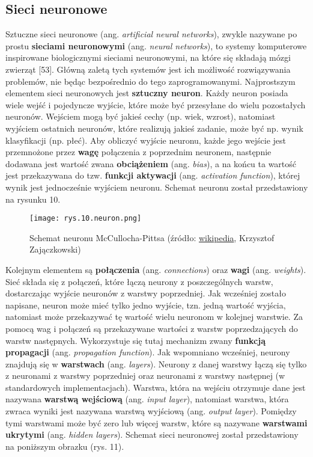 
\subsection{Sieci neuronowe}
\label{cha:Siecineuronowe}

Sztuczne sieci neuronowe (ang. \textit{artificial neural networks}), zwykle nazywane po prostu \textbf{sieciami neuronowymi} (ang. \textit{neural networks}), to systemy komputerowe inspirowane biologicznymi sieciami neuronowymi, na które się składają mózgi zwierząt [53]. Główną zaletą tych systemów jest ich możliwość rozwiązywania problemów, nie będąc bezpośrednio do tego zaprogramowanymi. Najprostszym elementem sieci neuronowych jest \textbf{sztuczny neuron}. Każdy neuron posiada wiele wejść i pojedyncze wyjście, które może być przesyłane do wielu pozostałych neuronów. Wejściem mogą być jakieś cechy (np. wiek, wzrost), natomiast wyjściem ostatnich neuronów, które realizują jakieś zadanie, może być np. wynik klasyfikacji (np. płeć). Aby obliczyć wyjście neuronu, każde jego wejście jest przemnożone przez \textbf{wagę} połączenia z poprzednim neuronem, następnie dodawana jest wartość zwana \textbf{obciążeniem} (ang. \textit{bias}), a na końcu ta wartość jest przekazywana do tzw. \textbf{funkcji aktywacji} (ang. \textit{activation function}), której wynik jest jednocześnie wyjściem neuronu. Schemat neuronu został przedstawiony na rysunku 10.
\begin{figure}[h]
    \centering
    \texttt{[image: rys.10.neuron.png]}
    \caption{Schemat neuronu McCullocha-Pittsa (źródło: \protect\href{https://pl.wikipedia.org/wiki/Neuron_McCullocha-Pittsa}{wikipedia}, Krzysztof Zajączkowski)}
    \label{fig:mesh10}
\end{figure}
Kolejnym elementem są \textbf{połączenia} (ang. \textit{connections}) oraz \textbf{wagi} (ang. \textit{weights}). Sieć składa się z połączeń, które łączą neurony z poszczególnych warstw, dostarczając wyjście neuronów z warstwy poprzedniej. Jak wcześniej zostało napisane, neuron może mieć tylko jedno wyjście, tzn. jedną wartość wyjścia, natomiast może przekazywać tę wartość wielu neuronom w kolejnej warstwie. Za pomocą wag i połączeń są przekazywane wartości z warstw poprzedzających do warstw następnych. Wykorzystuje się tutaj mechanizm zwany \textbf{funkcją propagacji} (ang. \textit{propagation function}). Jak wspomniano wcześniej, neurony znajdują się w \textbf{warstwach} (ang. \textit{layers}). Neurony z danej warstwy łączą się tylko z neuronami z warstwy poprzedniej oraz neuronami z warstwy następnej (w standardowych implementacjach). Warstwa, która na wejściu otrzymuje dane jest nazywana \textbf{warstwą wejściową} (ang. \textit{input layer}), natomiast warstwa, która zwraca wyniki jest nazywana warstwą wyjściową (ang. \textit{output layer}). Pomiędzy tymi warstwami może być zero lub więcej warstw, które są nazywane \textbf{warstwami ukrytymi} (ang. \textit{hidden layers}). Schemat sieci neuronowej został przedstawiony na poniższym obrazku (rys. 11). 
